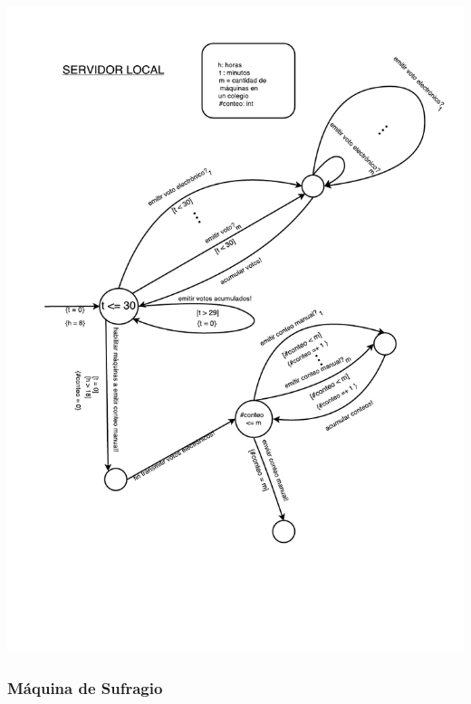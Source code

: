 \documentclass[spanish, 10pt,a4paper]{article}
\numberwithin{equation}{section} %
\begin{document}
\vspace{\baselineskip}
    \begin{center}
                \includegraphics[scale=0.75, page=1]{imagenes/fsm/FSMServidorLocal.pdf}
                \\
                \vspace{1pt}
                \footnotesize\textit{}
        \end{center}
\vspace{\baselineskip}
\vspace{-10px}

\subsubsection{Máquina de Sufragio}
\end{document}
